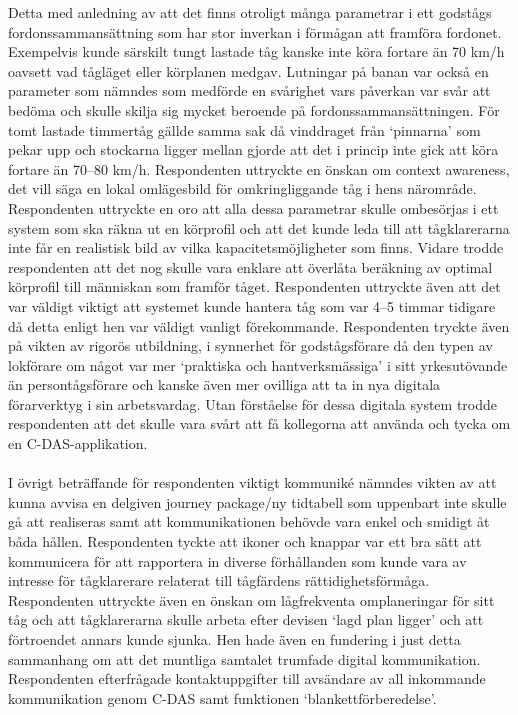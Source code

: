 \begin{enumerate}
    Detta med anledning av att det finns otroligt många parametrar i ett godstågs fordonssammansättning som har stor inverkan i förmågan att framföra fordonet.
    Exempelvis kunde särskilt tungt lastade tåg kanske inte köra fortare än 70 km/h oavsett vad tågläget eller körplanen medgav.
    Lutningar på banan var också en parameter som nämndes som medförde en svårighet vars påverkan var svår att bedöma och skulle skilja sig mycket beroende på fordonssammansättningen.
    För tomt lastade timmertåg gällde samma sak då vinddraget från \lq{}pinnarna\rq{} som pekar upp och stockarna ligger mellan gjorde att det i princip inte gick att köra fortare än 70--80 km/h.
    Respondenten uttryckte en önskan om context awareness, det vill säga en lokal omlägesbild för omkringliggande tåg i hens närområde.
    Respondenten uttryckte en oro att alla dessa parametrar skulle ombesörjas i ett system som ska räkna ut en körprofil och att det kunde leda till att tågklarerarna inte får en realistisk bild av vilka kapacitetsmöjligheter som finns.
    Vidare trodde respondenten att det nog skulle vara enklare att överlåta beräkning av optimal körprofil till människan som framför tåget.
    Respondenten uttryckte även att det var väldigt viktigt att systemet kunde hantera tåg som var 4--5 timmar tidigare då detta enligt hen var väldigt vanligt förekommande.
    Respondenten tryckte även på vikten av rigorös utbildning, i synnerhet för godstågsförare då den typen av lokförare om något var mer \lq{}praktiska och hantverksmässiga\rq{} i sitt yrkesutövande än persontågsförare och kanske även mer ovilliga att ta in nya digitala förarverktyg i sin arbetsvardag.
    Utan förståelse för dessa digitala system trodde respondenten att det skulle vara svårt att få kollegorna att använda och tycka om en C-DAS-applikation.
    \paragraph{}
    \hspace{-12pt}
    I övrigt beträffande för respondenten viktigt kommuniké nämndes vikten av att kunna avvisa en delgiven journey package/ny tidtabell som uppenbart inte skulle gå att realiseras samt att kommunikationen behövde vara enkel och smidigt åt båda hållen.
    Respondenten tyckte att ikoner och knappar var ett bra sätt att kommunicera för att rapportera in diverse förhållanden som kunde vara av intresse för tågklarerare relaterat till tågfärdens rättidighetsförmåga.
    Respondenten uttryckte även en önskan om lågfrekventa omplaneringar för sitt tåg och att tågklarerarna skulle arbeta efter devisen \lq{}lagd plan ligger\rq{} och att förtroendet annars kunde sjunka.
    Hen hade även en fundering i just detta sammanhang om att det muntliga samtalet trumfade digital kommunikation.
    Respondenten efterfrågade kontaktuppgifter till avsändare av all inkommande kommunikation genom C-DAS samt funktionen \lq{}blankettförberedelse\rq{}.
\end{enumerate}
